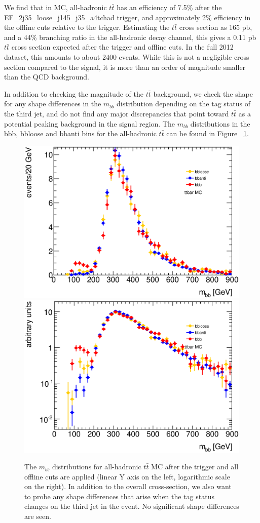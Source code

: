 We find that in MC, all-hadronic $t\bar{t}$ has an efficiency of 7.5\% after
the EF\_2j35\_loose\_j145\_j35\_a4tchad trigger, and approximately 2\% efficiency
in the offline cuts relative to the trigger.  Estimating the $t\bar{t}$ cross section
as 165 pb, and a 44\% branching ratio in the all-hadronic decay channel, this gives
a 0.11 pb $t\bar{t}$ cross section expected after the trigger and offline cuts.  In the
full 2012 dataset, this amounts to about 2400 events.  While
this is not a negligible cross section compared to the signal, it is more than an
order of magnitude smaller than the QCD background.

In addition to checking the magnitude of the $t\bar{t}$ background, we check the shape
for any shape differences in the $m_{bb}$ distribution depending on the tag status of the
third jet, and do not find any major discrepancies that point toward $t\bar{t}$ as a
potential peaking background in the signal region. The $m_{bb}$ distributions in the
bbb, bbloose and bbanti bins for the all-hadronic $t\bar{t}$ can be found in Figure
~\ref{fig:ttbar_mbb}.




\begin{figure}[hbt]
\includegraphics[width=0.45\linewidth]{BackgroundEstimation/images/mbb_compare_bbb_bbloose_bbanti_ttbar.eps}
\includegraphics[width=0.45\linewidth]{BackgroundEstimation/images/mbb_compare_bbb_bbloose_bbanti_ttbar_logy.eps}
\caption{The $m_{bb}$ distributions for all-hadronic $t\bar{t}$ MC after the trigger and all offline cuts are applied (linear Y axis on the left, logarithmic scale on the right).  In addition to the overall cross-section, we also want to probe any shape differences that arise when the tag status changes on the third jet in the event.  No significant shape differences are seen.}
\label{fig:ttbar_mbb}
\end{figure}

















